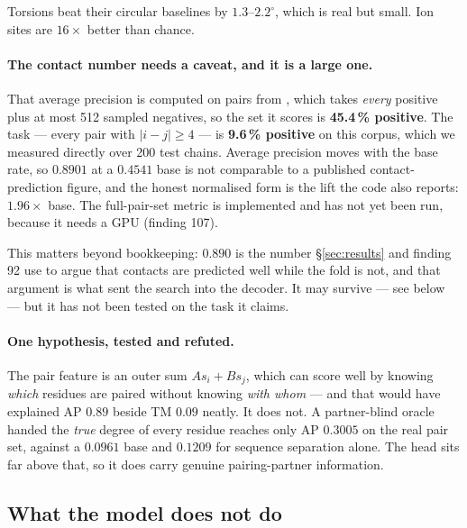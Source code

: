 \documentclass[11pt,a4paper]{article}
\begin{document}
Torsions beat their circular baselines by $1.3$--$2.2^\circ$, which is
real but small. Ion sites are $16\times$ better than chance.

\paragraph{The contact number needs a caveat, and it is a large one.}
That average precision is computed on pairs from ,
which takes \emph{every} positive plus at most 512 sampled negatives, so
the set it scores is \textbf{45.4\,\% positive}. The task --- every pair
with $|i-j| \ge 4$ --- is \textbf{9.6\,\% positive} on this corpus, which
we measured directly over 200 test chains. Average precision moves with
the base rate, so $0.8901$ at a $0.4541$ base is not comparable to a
published contact-prediction figure, and the honest normalised form is
the lift the code also reports: $1.96\times$ base. The full-pair-set
metric is implemented and has not yet been run, because it needs a GPU
(finding 107).

This matters beyond bookkeeping: $0.890$ is the number
\S\ref{sec:results} and finding 92 use to argue that contacts are
predicted well while the fold is not, and that argument is what sent the
search into the decoder. It may survive --- see below --- but it has not
been tested on the task it claims.

\paragraph{One hypothesis, tested and refuted.} The pair feature is an
outer sum $A s_i + B s_j$, which can score well by knowing \emph{which}
residues are paired without knowing \emph{with whom} --- and that would
have explained AP $0.89$ beside TM $0.09$ neatly. It does not. A
partner-blind oracle handed the \emph{true} degree of every residue
reaches only AP $0.3005$ on the real pair set, against a $0.0961$ base
and $0.1209$ for sequence separation alone. The head sits far above that,
so it does carry genuine pairing-partner information.

\subsection{What the model does not do}
\end{document}
